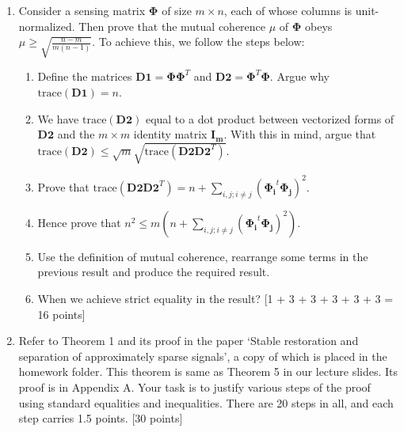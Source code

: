 \documentclass[11pt]{article}
\begin{document}
\begin{enumerate}
\item Consider a sensing matrix $\boldsymbol{\Phi}$ of size $m \times n$, each of whose columns is unit-normalized. Then prove that the mutual coherence $\mu$ of $\boldsymbol{\Phi}$ obeys $\mu \geq \sqrt{\frac{n-m}{m(n-1)}}$. To achieve this, we follow the steps below:
\begin{enumerate}
\item Define the matrices $\boldsymbol{D1} = \boldsymbol{\Phi \Phi}^T$ and $\boldsymbol{D2} = \boldsymbol{\Phi}^T\boldsymbol{\Phi}$. Argue why $\text{trace}(\boldsymbol{D1}) = n$.
\item We have $\text{trace}(\boldsymbol{D2})$ equal to a dot product between vectorized forms of $\boldsymbol{D2}$ and the $m \times m$ identity matrix $\boldsymbol{I_m}$. With this in mind, argue that $\text{trace}(\boldsymbol{D2}) \leq \sqrt{m} \sqrt{\text{trace}(\boldsymbol{D2}\boldsymbol{D2}^T)}$. 
\item Prove that $\text{trace}(\boldsymbol{D2}\boldsymbol{D2}^T) = n + \sum_{i,j;i \neq j} (\boldsymbol{\Phi_i}^t \boldsymbol{\Phi_j})^2$. 
\item Hence prove that $n^2 \leq m(n + \sum_{i,j;i \neq j} (\boldsymbol{\Phi_i}^t \boldsymbol{\Phi_j})^2)$.
\item Use the definition of mutual coherence, rearrange some terms in the previous result and produce the required result.
\item When we achieve strict equality in the result? \textsf{[1 + 3 + 3 + 3 + 3 + 3 = 16 points]}
\end{enumerate}

\item Refer to Theorem 1 and its proof in the paper `Stable restoration and separation of approximately sparse signals', a copy of which is placed in the homework folder. This theorem is same as Theorem 5 in our lecture slides. Its proof is in Appendix A. Your task is to justify various steps of the proof using standard equalities and inequalities. There are 20 steps in all, and each step carries 1.5 points. \textsf{[30 points]} 


\end{enumerate}
\end{document}
